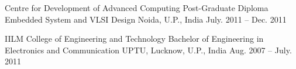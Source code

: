 
\begin{cventries}
  \cventry
    {Centre for Development of Advanced Computing} %
    {Post-Graduate Diploma Embedded System and VLSI Design} %
    {Noida, U.P., India} %
    {July. 2011 -- Dec. 2011} %
    {}
    
  \cventry
    {IILM College of Engineering and Technology} %
    {Bachelor of Engineering in Electronics and Communication} %
    {UPTU, Lucknow, U.P., India} %
    {Aug. 2007 -- July. 2011} %
    {}


\end{cventries}
